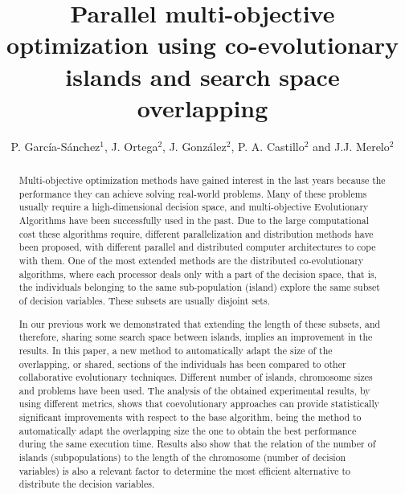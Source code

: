 \documentclass[preprint]{elsarticle}
\begin{document}
\begin{frontmatter}


\title{Parallel multi-objective optimization using co-evolutionary islands and search space overlapping}


\author{P. Garc\'ia-S\'anchez$^1$, J. Ortega$^2$, J. Gonz\'alez$^2$, P. A. Castillo$^2$ and J.J. Merelo$^2$}
\address{
$^1$ Department of Computer Science and Engineering. ESI. University of C\'adiz, Spain\\
$^2$ Department of Computer Architecture and Computer Technology.\\ ETSIIT - CITIC. University of Granada, Spain\\
}


\begin{abstract}
Multi-objective optimization methods have gained interest in the last years because the performance they can achieve solving real-world problems. Many of these problems usually require a high-dimensional decision space, and multi-objective Evolutionary Algorithms have been successfully used in the past. Due to the large computational cost these algorithms require, different parallelization and distribution methods have been proposed, with different parallel and distributed computer architectures to cope with them. One of the most extended methods are the distributed co-evolutionary algorithms, where each processor deals only with a part of the decision space, that is, the individuals belonging to the same sub-population (island) explore the same subset of decision variables. These subsets are usually disjoint sets.

In our previous work we demonstrated that extending the length of these subsets, and therefore, sharing some search space between islands, implies an improvement in the results. In this paper, a new method to automatically adapt the size of the overlapping, or shared, sections of the individuals has been compared to other collaborative evolutionary techniques. Different number of islands, chromosome sizes and problems have been used. The analysis of the obtained experimental results, by using different metrics, shows that coevolutionary approaches can provide statistically significant improvements with respect to the base algorithm, being the method to automatically adapt the overlapping size the one to obtain the best performance during the same execution time. Results also show that the relation of the number of islands (subpopulations) to the length of the chromosome (number of decision variables) is also a relevant factor to determine the most efficient alternative to distribute the decision variables.
\end{abstract}



\end{frontmatter}
\end{document}
